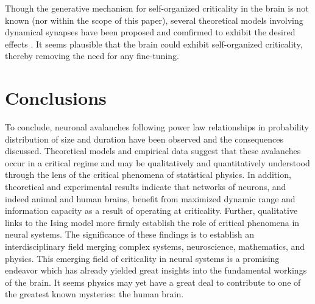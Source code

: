 \documentclass[12pt]{article}
\begin{document}
Though the generative mechanism for self-organized criticality in the brain is not known (nor within the scope of this paper), several theoretical models involving dynamical synapses have been proposed and comfirmed to exhibit the desired effects \cite{Levina2007a, Levina2009a, Bornholdt2003a, Rybarsch2014a}. It seems plausible that the brain could exhibit self-organized criticality, thereby removing the need for any fine-tuning.

\section*{Conclusions}

To conclude, neuronal avalanches following power law relationships in probability distribution of size and duration have been observed and the consequences discussed. Theoretical models and empirical data suggest that these avalanches occur in a critical regime and may be qualitatively and quantitatively understood through the lens of the critical phenomena of statistical physics. In addition, theoretical and experimental results indicate that networks of neurons, and indeed animal and human brains, benefit from maximized dynamic range and information capacity as a result of operating at criticality. Further, qualitative links to the Ising model more firmly establish the role of critical phenomena in neural systems. The significance of these findings is to establish an interdisciplinary field merging complex systems, neuroscience, mathematics, and physics. This emerging field of criticality in neural systems is a promising endeavor which has already yielded great insights into the fundamental workings of the brain. It seems physics may yet have a great deal to contribute to one of the greatest known mysteries: the human brain. 




\end{document}
